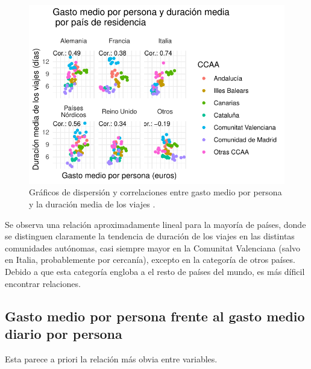 \documentclass[data,article,submit,moreauthors,pdftex]{Definitions/mdpi}
\begin{document}
\begin{figure}[H]
\includegraphics{ProyectoAED2024_Rmd_files/figure-latex/unnamed-chunk-36-1} \caption{Gráficos de dispersión y correlaciones entre gasto medio por persona y la duración media de los viajes .\label{fig:gastomediovsduracionmedia}}\label{fig:unnamed-chunk-36}
\end{figure}

Se observa una relación aproximadamente lineal para la mayoría de
países, donde se distinguen claramente la tendencia de duración de los
viajes en las distintas comunidades autónomas, casi siempre mayor en la
Comunitat Valenciana (salvo en Italia, probablemente por cercanía),
excepto en la categoría de otros países. Debido a que esta categoría
engloba a el resto de países del mundo, es más díficil encontrar
relaciones.

\subsection{Gasto medio por persona frente al gasto medio diario por
persona}\label{gasto-medio-por-persona-frente-al-gasto-medio-diario-por-persona}

Esta parece a priori la relación más obvia entre variables.
\end{document}
